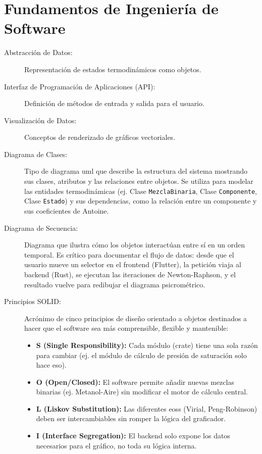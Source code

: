 \section{Fundamentos de Ingeniería de Software}
    \begin{description}
        \item[Abstracción de Datos:] Representación de estados termodinámicos como objetos.
        \item[Interfaz de Programación de Aplicaciones (API):] Definición de métodos de entrada y salida para el usuario.
        \item[Visualización de Datos:] Conceptos de renderizado de gráficos vectoriales.
        \item[Diagrama de Clases:] Tipo de diagrama \gls{uml} que describe la estructura del sistema mostrando sus clases, atributos y las relaciones entre objetos. Se utiliza para modelar las entidades termodinámicas (ej. Clase \texttt{MezclaBinaria}, Clase \texttt{Componente}, Clase \texttt{Estado}) y sus dependencias, como la relación entre un componente y sus coeficientes de Antoine.
        \item[Diagrama de Secuencia:] Diagrama que ilustra cómo los objetos interactúan entre sí en un orden temporal. Es crítico para documentar el flujo de datos: desde que el usuario mueve un selector en el frontend (Flutter), la petición viaja al backend (Rust), se ejecutan las iteraciones de Newton-Raphson, y el resultado vuelve para redibujar el diagrama psicrométrico.
        \item[Principios SOLID:] Acrónimo de cinco principios de diseño orientado a objetos destinados a hacer que el software sea más comprensible, flexible y mantenible:
            \begin{itemize}
                \item \textbf{S (Single Responsibility):} Cada módulo (crate) tiene una sola razón para cambiar (ej. el módulo de cálculo de presión de saturación solo hace eso).
                \item \textbf{O (Open/Closed):} El software permite añadir nuevas mezclas binarias (ej. Metanol-Aire) sin modificar el motor de cálculo central.
                \item \textbf{L (Liskov Substitution):} Las diferentes \glspl{eos} (Virial, Peng-Robinson) deben ser intercambiables sin romper la lógica del graficador.
                \item \textbf{I (Interface Segregation):} El backend solo expone los datos necesarios para el gráfico, no toda su lógica interna.

\end{itemize}
\end{description}

